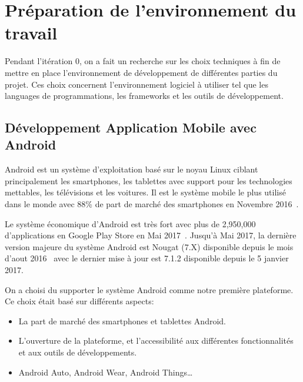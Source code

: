 \section{Préparation de l'environnement du travail}

Pendant l'itération 0, on a fait un recherche sur les choix techniques à fin de
mettre en place l'environnement de développement de différentes parties du
projet. Ces choix concernent l'environnement logiciel à utiliser tel que les
languages de programmations, les frameworks et les outils de développement.


\subsection{Développement Application Mobile avec Android}

Android est un système d'exploitation basé sur le noyau Linux ciblant
principalement les smartphones, les tablettes avec support pour les
technologies mettables, les télévisions et les voitures. Il est le système
mobile le plus utilisé dans le monde avec 88\% de part de marché des
smartphones en Novembre 2016~\cite{android-market-share}.

Le système économique d'Android est très fort avec plus de 2,950,000
d'applications en Google Play Store en Mai 2017~\cite{android-apps}. Jusqu'à
Mai 2017, la dernière version majeure du système Android est Nougat (7.X)
disponible depuis le mois d'aout 2016~\cite{android-7-release} avec le dernier
mise à jour est 7.1.2 disponible depuis le 5 janvier 2017.

On a choisi du supporter le système Android comme notre première plateforme. Ce
choix était basé sur différents aspects:

\begin{itemize}
    \item La part de marché des smartphones et tablettes Android.
    \item L'ouverture de la plateforme, et l'accessibilité aux différentes
        fonctionnalités et aux outils de développements.
    \item Android Auto, Android Wear, Android Things\ldots
\end{itemize}

